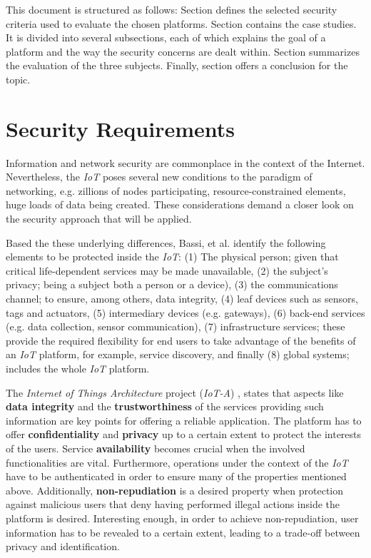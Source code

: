 \documentclass[journal]{IEEEtran}
\begin{document}
  This document is structured as follows: Section \uppercase\expandafter{} defines the selected security criteria used to evaluate the chosen platforms. Section \uppercase\expandafter{} contains the case studies. It is divided into several subsections, each of which explains the goal of a platform and the way the security concerns are dealt within. Section \uppercase\expandafter{} summarizes the evaluation of the three subjects. Finally, section \uppercase\expandafter{} offers a conclusion for the topic.

\section{Security Requirements}
  Information and network security are commonplace in the context of the Internet. Nevertheless, the \emph{IoT} poses several new conditions to the paradigm of networking, e.g. zillions of nodes participating, resource-constrained elements, huge loads of data being created. These considerations demand a closer look on the security approach that will be applied.

  Based the these underlying differences, Bassi, et al. \cite{Bassi2013} identify the following elements to be protected inside the \emph{IoT}: (1) The physical person; given that critical life-dependent services may be made unavailable, (2) the subject's privacy; being a subject both a person or a device), (3) the communications channel; to ensure, among others, data integrity, (4) leaf devices such as sensors, tags and actuators, (5) intermediary devices (e.g. gateways), (6) back-end services (e.g. data collection, sensor communication), (7) infrastructure services; these provide the required flexibility for end users to take advantage of the benefits of an \emph{IoT} platform, for example, service discovery, and finally (8) global systems; includes the whole \emph{IoT} platform.

  The \emph{Internet of Things Architecture} project (\emph{IoT-A}) \cite{Salinas2013}, states that aspects like \textbf{data integrity} and the \textbf{trustworthiness} of the services providing such information are key points for offering a reliable application. The platform has to offer \textbf{confidentiality} and \textbf{privacy} up to a certain extent to protect the interests of the users. Service \textbf{availability} becomes crucial when the involved functionalities are vital. Furthermore, operations under the context of the \emph{IoT} have to be authenticated in order to ensure many of the properties mentioned above. Additionally, \textbf{non-repudiation} is a desired property when protection against malicious users that deny having performed illegal actions inside the platform is desired. Interesting enough, in order to achieve non-repudiation, user information has to be revealed to a certain extent, leading to a trade-off between privacy and identification.
\end{document}
